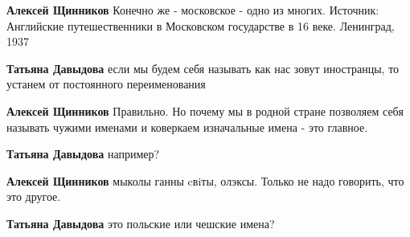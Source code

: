 \begin{itemize}
\begin{itemize}
 
\textbf{Алексей Щинников} Конечно же - московское - одно из многих. Источник: Английские путешественники в Московском государстве в 16 веке. Ленинград, 1937

 
\textbf{Татьяна Давыдова} если мы будем себя называть как нас зовут иностранцы, то устанем от постоянного переименования

 
\textbf{Алексей Щинников} Правильно. Но почему мы в родной стране позволяем себя называть чужими именами и коверкаем изначальные имена - это главное.

 
\textbf{Татьяна Давыдова} например?

 
\textbf{Алексей Щинников} мыколы ганны cвiты, олэксы. Только не надо говорить, что это другое.

 
\textbf{Татьяна Давыдова} это польские или чешские имена?


\end{itemize}
\end{itemize}
